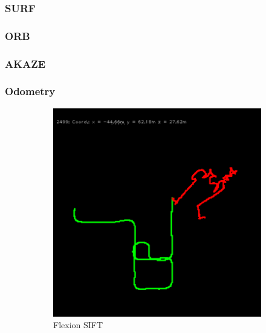 \subsubsection{SURF}
\subsubsection{ORB}
\subsubsection{AKAZE}
\subsubsection{Odometry}

\begin{figure}[H]
\begin{subfigure}[c]{0.31\linewidth}
    \includegraphics[width=\linewidth]{chapter06/odo/jonas_flexion_SIFT.png}%
    \caption{Flexion SIFT}
\end{subfigure}%
\begin{subfigure}[c]{0.31\linewidth}

\end{subfigure}
\end{figure}

